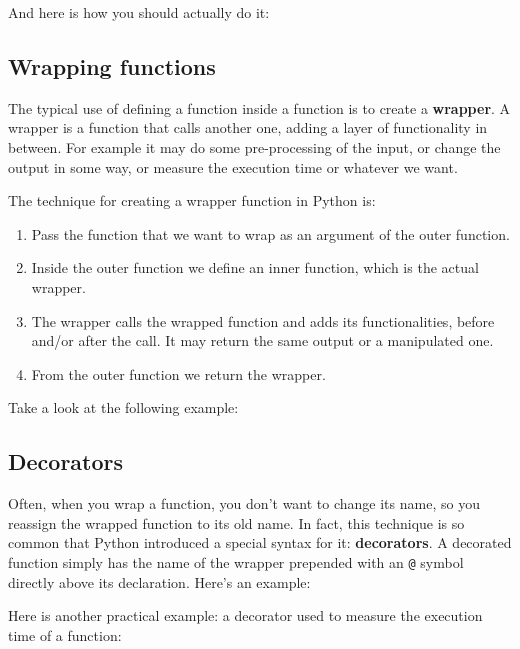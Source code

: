 

\bigskip

And here is how you should actually do it:

\bigskip



\subsection{Wrapping functions}
The typical use of defining a function inside a function is to create a \textbf{wrapper}. A wrapper is a function that calls another one, adding a layer of functionality in between. For example it may do some pre-processing of the input, or change the output in some way, or measure the execution time or whatever we want.

The technique for creating a wrapper function in Python is:
\begin{enumerate}
    \item Pass the function that we want to wrap as an argument of the outer function.
    \item Inside the outer function we define an inner function, which is the actual wrapper.
    \item The wrapper calls the wrapped function and adds its functionalities, before and/or after the call. It may return the same output or a manipulated one.
    \item From the outer function we return the wrapper.
\end{enumerate}
Take a look at the following example:



\subsection{Decorators}
Often, when you wrap a function, you don't want to change its name, so you reassign the wrapped function to its old name. In fact, this technique is so common that Python introduced a special syntax for it: \textbf{decorators}. A decorated function simply has the name of the wrapper prepended with an \texttt{@} symbol directly above its declaration. Here's an example:



\hrulefill

Here is another practical example: a decorator used to measure the execution time of a function:



